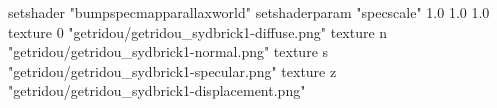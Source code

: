 setshader "bumpspecmapparallaxworld"
setshaderparam "specscale" 1.0 1.0 1.0
texture 0 "getridou/getridou_sydbrick1-diffuse.png"
texture n "getridou/getridou_sydbrick1-normal.png"
texture s "getridou/getridou_sydbrick1-specular.png"
texture z "getridou/getridou_sydbrick1-displacement.png"
